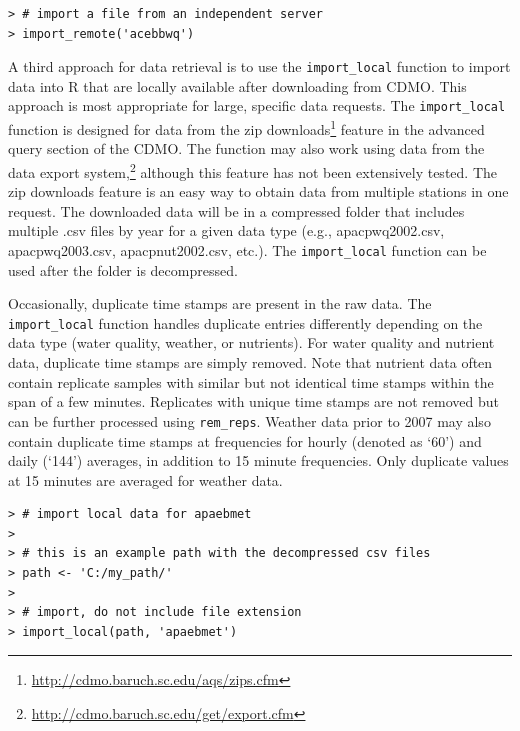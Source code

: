 \documentclass[10pt,letterpaper]{article}\usepackage[]{graphicx}\usepackage[]{color}
\makeatletter
\newenvironment{kframe}{%
 \def\at@end@of@kframe{}%
 \ifinner\ifhmode%
  \def\at@end@of@kframe{\end{minipage}}%
  \begin{minipage}{\columnwidth}%
 \fi\fi%
 \def\FrameCommand##1{\hskip\@totalleftmargin \hskip-\fboxsep
 \colorbox{shadecolor}{##1}\hskip-\fboxsep
     \hskip-\linewidth \hskip-\@totalleftmargin \hskip\columnwidth}%
 \MakeFramed {\advance\hsize-\width
   \@totalleftmargin\z@ \linewidth\hsize
   \@setminipage}}%
 {\par\unskip\endMakeFramed%
 \at@end@of@kframe}
\newenvironment{knitrout}{}{} %
\makeatother
\begin{document}
\begin{knitrout}
\color{fgcolor}\begin{kframe}
\begin{verbatim}
> # import a file from an independent server
> import_remote('acebbwq')
\end{verbatim}
\end{kframe}
\end{knitrout}

A third approach for data retrieval is to use the \texttt{import\_local} function to import data into R that are locally available after downloading from \ac{CDMO}.  This approach is most appropriate for large, specific data requests. The \texttt{import\_local} function is designed for data from the zip downloads\footnote{\url{http://cdmo.baruch.sc.edu/aqs/zips.cfm}} feature in the advanced query section of the \ac{CDMO}. The function may also work using data from the data export system,\footnote{\url{http://cdmo.baruch.sc.edu/get/export.cfm}} although this feature has not been extensively tested.  The zip downloads feature is an easy way to obtain data from multiple stations in one request.  The downloaded data will be in a compressed folder that includes multiple .csv files by year for a given data type (e.g., apacpwq2002.csv, apacpwq2003.csv, apacpnut2002.csv, etc.).  The \texttt{import\_local} function can be used after the folder is decompressed.

Occasionally, duplicate time stamps are present in the raw data.  The \texttt{import\_local} function handles duplicate entries differently depending on the data type (water quality,  weather, or nutrients).  For water quality and nutrient data, duplicate time stamps are simply removed.  Note that nutrient data often contain replicate samples with similar but not identical time stamps within the span of a few minutes.  Replicates with unique time stamps are not removed but can be further processed using \texttt{rem\_reps}.  Weather data prior to 2007 may also contain duplicate time stamps at frequencies for hourly (denoted as `60') and daily (`144') averages, in addition to 15 minute frequencies.  Only duplicate values at 15 minutes are averaged for weather data.  

\begin{knitrout}
\color{fgcolor}\begin{kframe}
\begin{verbatim}
> # import local data for apaebmet
> 
> # this is an example path with the decompressed csv files
> path <- 'C:/my_path/'
> 
> # import, do not include file extension
> import_local(path, 'apaebmet') 
\end{verbatim}
\end{kframe}
\end{knitrout}
\end{document}
